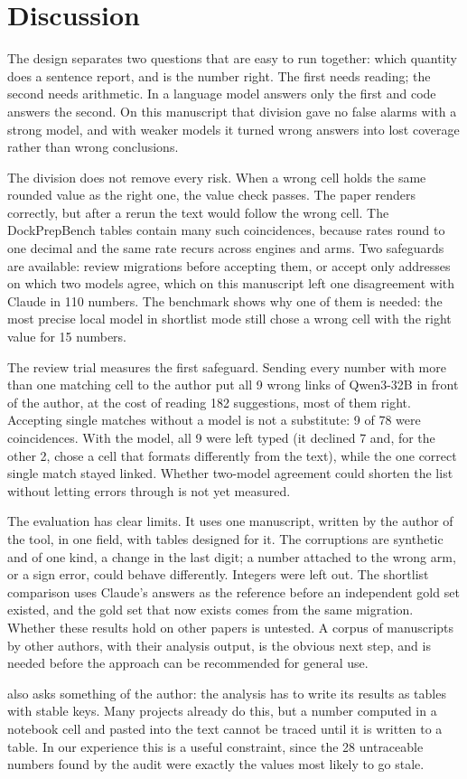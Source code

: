 \section{Discussion}
\label{sec:discussion}

The design separates two questions that are easy to run together: which quantity does a sentence
report, and is the number right. The first needs reading; the second needs arithmetic. In \pv{} a
language model answers only the first and code answers the second. On this manuscript that
division gave no false alarms with a strong model, and with weaker models it turned wrong answers
into lost coverage rather than wrong conclusions.

The division does not remove every risk. When a wrong cell holds the same rounded value as the
right one, the value check passes. The paper renders correctly, but after a rerun the text would
follow the wrong cell. The DockPrepBench tables contain many such coincidences, because rates
round to one decimal and the same rate recurs across engines and arms. Two safeguards are
available: review migrations before accepting them, or accept only addresses on which two models
agree, which on this manuscript left one disagreement with Claude in 110 numbers. The benchmark
shows why one of them is needed: the most precise local model in shortlist mode still chose a
wrong cell with the right value for 15 numbers.

The review trial measures the first safeguard. Sending every number with more than one matching
cell to the author put all 9 wrong links of Qwen3-32B in front of the author, at the cost of
reading 182 suggestions, most of them right. Accepting single matches without a model is not a
substitute: 9 of 78 were coincidences. With the model, all 9 were left typed (it declined 7 and,
for the other 2, chose a cell that formats differently from the text), while the one correct
single match stayed linked. Whether two-model agreement could shorten the list without letting errors
through is not yet measured.

The evaluation has clear limits. It uses one manuscript, written by the author of the tool, in one
field, with tables designed for it. The corruptions are synthetic and of one kind, a change in the
last digit; a number attached to the wrong arm, or a sign error, could behave differently. Integers
were left out. The shortlist comparison uses Claude's answers as the reference before an
independent gold set existed, and the gold set that now exists comes from the same migration.
Whether these results hold on other papers is untested. A corpus of manuscripts by other authors,
with their analysis output, is the obvious next step, and is needed before the approach can be
recommended for general use.

\pv{} also asks something of the author: the analysis has to write its results as tables with
stable keys. Many projects already do this, but a number computed in a notebook cell and pasted
into the text cannot be traced until it is written to a table. In our experience this is a useful
constraint, since the 28 untraceable numbers found by the audit were exactly the values most
likely to go stale.
